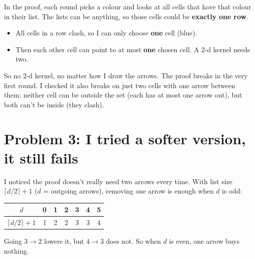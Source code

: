 \documentclass[11pt,a4paper]{article}
\begin{document}
In the proof, each round picks a colour and looks at all cells that have that colour in their list. The lists can be anything, so those cells could be \textbf{exactly one row}.

\begin{center}
\end{center}

\begin{itemize}[leftmargin=1.4em]
    \item All cells in a row clash, so I can only choose \textbf{one} cell (blue).
    \item Then each other cell can point to at most \textbf{one} chosen cell. A 2-d kernel needs two.
\end{itemize}

So no 2-d kernel, no matter how I draw the arrows. The proof breaks in the very first round. I checked it also breaks on just two cells with one arrow between them: neither cell can be outside the set (each has at most one arrow out), but both can't be inside (they clash).

\section*{Problem 3: I tried a softer version, it still fails}

I noticed the proof doesn't really need two arrows every time. With list size $\lceil d/2\rceil+1$ ($d$ = outgoing arrows), removing one arrow is enough when $d$ is odd:

\begin{center}
    \begin{tabular}{c|cccccc}
        $d$                  & 0 & 1 & 2 & 3 & 4 & 5 \\\hline
        $\lceil d/2\rceil+1$ & 1 & 2 & 2 & 3 & 3 & 4
    \end{tabular}
\end{center}

Going $3\to2$ lowers it, but $4\to3$ does not. So when $d$ is even, one arrow buys nothing.
\end{document}
